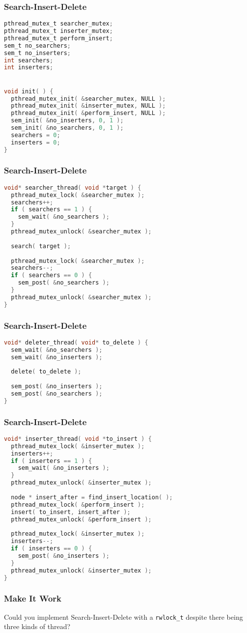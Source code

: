 \begin{frame}[fragile]
	\frametitle{Search-Insert-Delete}
	\begin{lstlisting}[language=C]
pthread_mutex_t searcher_mutex;
pthread_mutex_t inserter_mutex;
pthread_mutex_t perform_insert;
sem_t no_searchers;
sem_t no_inserters;
int searchers;
int inserters;


void init( ) {
  pthread_mutex_init( &searcher_mutex, NULL );
  pthread_mutex_init( &inserter_mutex, NULL );
  pthread_mutex_init( &perform_insert, NULL );
  sem_init( &no_inserters, 0, 1 );
  sem_init( &no_searchers, 0, 1 );
  searchers = 0;
  inserters = 0;
}
\end{lstlisting}
\end{frame}

\begin{frame}[fragile]
	\frametitle{Search-Insert-Delete}
	\begin{lstlisting}[language=C]
void* searcher_thread( void *target ) {
  pthread_mutex_lock( &searcher_mutex );
  searchers++;
  if ( searchers == 1 ) {
    sem_wait( &no_searchers );
  }
  pthread_mutex_unlock( &searcher_mutex );
  
  search( target );
  
  pthread_mutex_lock( &searcher_mutex );
  searchers--;
  if ( searchers == 0 ) {
    sem_post( &no_searchers );
  }
  pthread_mutex_unlock( &searcher_mutex );
}
\end{lstlisting}
\end{frame}

\begin{frame}[fragile]
	\frametitle{Search-Insert-Delete}
	\begin{lstlisting}[language=C]
void* deleter_thread( void* to_delete ) {
  sem_wait( &no_searchers );
  sem_wait( &no_inserters );
  
  delete( to_delete );
  
  sem_post( &no_inserters );
  sem_post( &no_searchers );
}
\end{lstlisting}
\end{frame}

\begin{frame}[fragile]
	\frametitle{Search-Insert-Delete}
	\begin{lstlisting}[language=C]
void* inserter_thread( void *to_insert ) {
  pthread_mutex_lock( &inserter_mutex );
  inserters++;
  if ( inserters == 1 ) {
    sem_wait( &no_inserters );
  }
  pthread_mutex_unlock( &inserter_mutex );
  
  node * insert_after = find_insert_location( );
  pthread_mutex_lock( &perform_insert );
  insert( to_insert, insert_after );
  pthread_mutex_unlock( &perform_insert );
  
  pthread_mutex_lock( &inserter_mutex );
  inserters--;
  if ( inserters == 0 ) {
    sem_post( &no_inserters );
  }
  pthread_mutex_unlock( &inserter_mutex );
}
\end{lstlisting}
\end{frame}

\begin{frame}
\frametitle{Make It Work}

Could you implement Search-Insert-Delete with a \texttt{rwlock\_t} despite there being three kinds of thread?

\end{frame}




